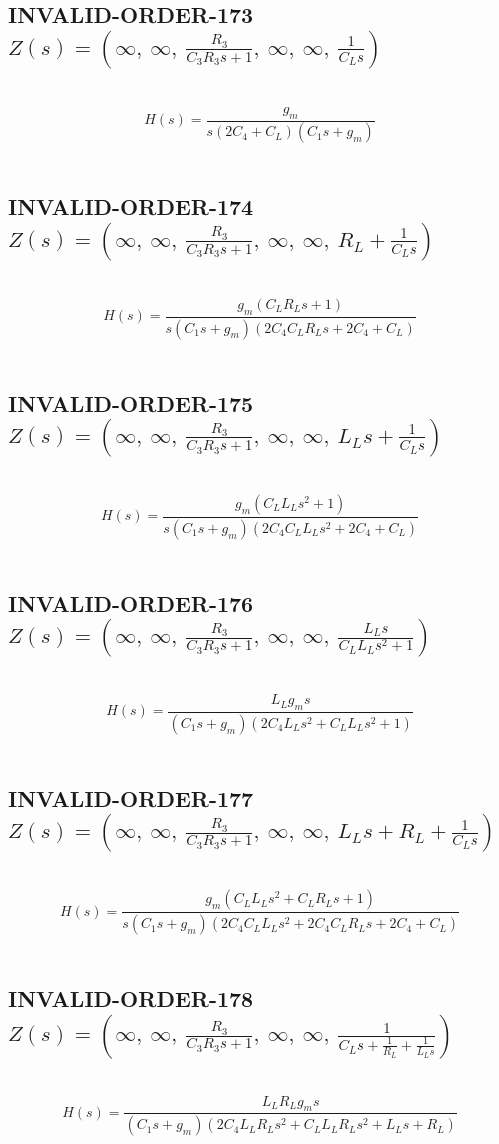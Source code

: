 \documentclass{article}
\begin{document}
\subsection{INVALID-ORDER-173 $Z(s) = \left( \infty, \  \infty, \  \frac{R_{3}}{C_{3} R_{3} s + 1}, \  \infty, \  \infty, \  \frac{1}{C_{L} s}\right)$ } \ 
\textbf{\[H(s) = \frac{g_{m}}{s \left(2 C_{4} + C_{L}\right) \left(C_{1} s + g_{m}\right)}\] } \ 
\subsection{INVALID-ORDER-174 $Z(s) = \left( \infty, \  \infty, \  \frac{R_{3}}{C_{3} R_{3} s + 1}, \  \infty, \  \infty, \  R_{L} + \frac{1}{C_{L} s}\right)$ } \ 
\textbf{\[H(s) = \frac{g_{m} \left(C_{L} R_{L} s + 1\right)}{s \left(C_{1} s + g_{m}\right) \left(2 C_{4} C_{L} R_{L} s + 2 C_{4} + C_{L}\right)}\] } \ 
\subsection{INVALID-ORDER-175 $Z(s) = \left( \infty, \  \infty, \  \frac{R_{3}}{C_{3} R_{3} s + 1}, \  \infty, \  \infty, \  L_{L} s + \frac{1}{C_{L} s}\right)$ } \ 
\textbf{\[H(s) = \frac{g_{m} \left(C_{L} L_{L} s^{2} + 1\right)}{s \left(C_{1} s + g_{m}\right) \left(2 C_{4} C_{L} L_{L} s^{2} + 2 C_{4} + C_{L}\right)}\] } \ 
\subsection{INVALID-ORDER-176 $Z(s) = \left( \infty, \  \infty, \  \frac{R_{3}}{C_{3} R_{3} s + 1}, \  \infty, \  \infty, \  \frac{L_{L} s}{C_{L} L_{L} s^{2} + 1}\right)$ } \ 
\textbf{\[H(s) = \frac{L_{L} g_{m} s}{\left(C_{1} s + g_{m}\right) \left(2 C_{4} L_{L} s^{2} + C_{L} L_{L} s^{2} + 1\right)}\] } \ 
\subsection{INVALID-ORDER-177 $Z(s) = \left( \infty, \  \infty, \  \frac{R_{3}}{C_{3} R_{3} s + 1}, \  \infty, \  \infty, \  L_{L} s + R_{L} + \frac{1}{C_{L} s}\right)$ } \ 
\textbf{\[H(s) = \frac{g_{m} \left(C_{L} L_{L} s^{2} + C_{L} R_{L} s + 1\right)}{s \left(C_{1} s + g_{m}\right) \left(2 C_{4} C_{L} L_{L} s^{2} + 2 C_{4} C_{L} R_{L} s + 2 C_{4} + C_{L}\right)}\] } \ 
\subsection{INVALID-ORDER-178 $Z(s) = \left( \infty, \  \infty, \  \frac{R_{3}}{C_{3} R_{3} s + 1}, \  \infty, \  \infty, \  \frac{1}{C_{L} s + \frac{1}{R_{L}} + \frac{1}{L_{L} s}}\right)$ } \ 
\textbf{\[H(s) = \frac{L_{L} R_{L} g_{m} s}{\left(C_{1} s + g_{m}\right) \left(2 C_{4} L_{L} R_{L} s^{2} + C_{L} L_{L} R_{L} s^{2} + L_{L} s + R_{L}\right)}\] } \ 
\end{document}
